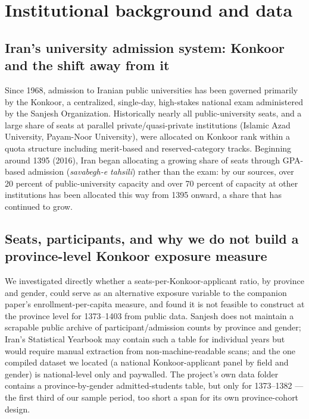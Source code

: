 \documentclass[11pt]{article}
\begin{document}
\section{Institutional background and data}

\subsection{Iran's university admission system: Konkoor and the shift away from it}

Since 1968, admission to Iranian public universities has been governed primarily by the Konkoor, a centralized, single-day, high-stakes national exam administered by the Sanjesh Organization. Historically nearly all public-university seats, and a large share of seats at parallel private/quasi-private institutions (Islamic Azad University, Payam-Noor University), were allocated on Konkoor rank within a quota structure including merit-based and reserved-category tracks. Beginning around 1395 (2016), Iran began allocating a growing share of seats through GPA-based admission (\emph{savabegh-e tahsili}) rather than the exam: by our sources, over 20 percent of public-university capacity and over 70 percent of capacity at other institutions has been allocated this way from 1395 onward, a share that has continued to grow.

\subsection{Seats, participants, and why we do not build a province-level Konkoor exposure measure}

We investigated directly whether a seats-per-Konkoor-applicant ratio, by province and gender, could serve as an alternative exposure variable to the companion paper's enrollment-per-capita measure, and found it is not feasible to construct at the province level for 1373--1403 from public data. Sanjesh does not maintain a scrapable public archive of participant/admission counts by province and gender; Iran's Statistical Yearbook may contain such a table for individual years but would require manual extraction from non-machine-readable scans; and the one compiled dataset we located (a national Konkoor-applicant panel by field and gender) is national-level only and paywalled. The project's own data folder contains a province-by-gender admitted-students table, but only for 1373--1382 --- the first third of our sample period, too short a span for its own province-cohort design.
\end{document}
